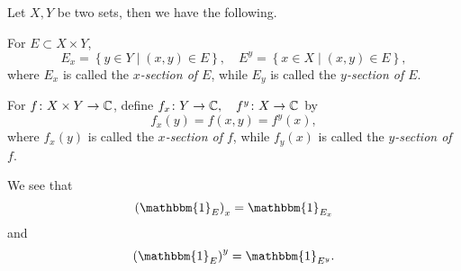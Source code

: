 \begin{definition*}
	Let \(X, Y\) be two sets, then we have the following.
	\begin{definition}
		For \(E\subset X\times Y\),
		\[
			E_x = \left\{y\in Y \mid (x, y)\in E\right\},\quad E^y = \left\{x\in X \mid (x, y)\in E\right\},
		\]
		where \(E_x\) is called the \emph{\(x\)-section of \(E\)}, while \(E_y\) is called the \emph{\(y\)-section of \(E\)}.
	\end{definition}
	\begin{definition}
		For \(f\colon X\times Y\to \mathbb{\MakeUppercase{c}} \), define \(f_x\colon Y\to \mathbb{\MakeUppercase{c}} ,\quad f^y\colon X\to \mathbb{\MakeUppercase{c}}\)
		by
		\[
			f_x(y) = f(x, y) = f^y(x),
		\]
		where \(f_x(y)\) is called the \emph{\(x\)-section of \(f\)}, while \(f_y(x)\) is called the \emph{\(y\)-section of \(f\)}.
	\end{definition}
\end{definition*}
\begin{eg}
	We see that
	\[
		\left(\mathbbm{1}_{E} \right)_x = \mathbbm{1}_{E_x}
	\]
	and
	\[
		\left(\mathbbm{1}_{E} \right)^y = \mathbbm{1}_{E^y}.
	\]
\end{eg}

